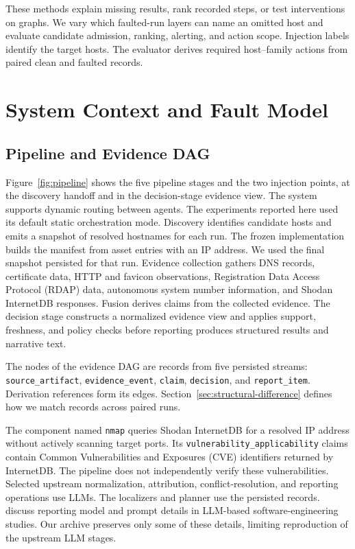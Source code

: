 \documentclass[sn-basic]{sn-jnl}%
\theoremstyle{thmstyleone}%
\theoremstyle{thmstyletwo}%
\theoremstyle{thmstylethree}%
\begin{document}
These methods explain missing results, rank recorded steps, or test interventions on graphs. We vary which faulted-run layers can name an omitted host and evaluate candidate admission, ranking, alerting, and action scope. Injection labels identify the target hosts. The evaluator derives required host--family actions from paired clean and faulted records.

\section{System Context and Fault Model}\label{sec:system-context}

\subsection{Pipeline and Evidence DAG}\label{sec:pipeline-evidence-dag}

Figure~\ref{fig:pipeline} shows the five pipeline stages and the two injection points, at the discovery handoff and in the decision-stage evidence view. The system supports dynamic routing between agents. The experiments reported here used its default static orchestration mode. Discovery identifies candidate hosts and emits a snapshot of resolved hostnames for each run. The frozen implementation builds the manifest from asset entries with an IP address. We used the final snapshot persisted for that run. Evidence collection gathers DNS records, certificate data, HTTP and favicon observations, Registration Data Access Protocol (RDAP) data, autonomous system number information, and Shodan InternetDB responses. Fusion derives claims from the collected evidence. The decision stage constructs a normalized evidence view and applies support, freshness, and policy checks before reporting produces structured results and narrative text.

The nodes of the evidence DAG are records from five persisted streams: \texttt{source\_artifact}, \texttt{evidence\_event}, \texttt{claim}, \texttt{decision}, and \texttt{report\_item}. Derivation references form its edges. Section~\ref{sec:structural-difference} defines how we match records across paired runs.

The component named \texttt{nmap} queries Shodan InternetDB for a resolved IP address without actively scanning target ports. Its \texttt{vulnerability\_applicability} claims contain Common Vulnerabilities and Exposures (CVE) identifiers returned by InternetDB. The pipeline does not independently verify these vulnerabilities. Selected upstream normalization, attribution, conflict-resolution, and reporting operations use LLMs. The localizers and planner use the persisted records. \citet{baltes2027} discuss reporting model and prompt details in LLM-based software-engineering studies. Our archive preserves only some of these details, limiting reproduction of the upstream LLM stages.
\end{document}
